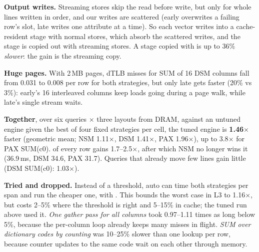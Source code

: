 \textbf{Output writes.} Streaming stores skip the read before write, but only for whole lines
written in order, and our writes are scattered (early overwrites a failing row's slot, late
writes one attribute at a time). So each vector writes into a cache-resident stage with normal
stores, which absorb the scattered writes, and the stage is copied out with streaming stores. A
stage copied with  is up to 36\% \emph{slower}: the gain is the streaming copy.

\textbf{Huge pages.} With 2\,MB pages, dTLB misses for SUM of 16 DSM columns fall from 0.031 to
0.008 per row for both strategies, but only late gets faster (20\% vs 3\%): early's 16
interleaved columns keep loads going during a page walk, while late's single stream waits.

\textbf{Together}, over six queries $\times$ three layouts from DRAM, against an untuned engine
given the best of four fixed strategies per cell, the tuned engine is \textbf{1.46$\times$}
faster (geometric mean; NSM 1.11$\times$, DSM 1.41$\times$, PAX 1.96$\times$), up to 3.8$\times$
for PAX SUM(c0).  of every row gains 1.7--2.5$\times$, after which NSM no longer
wins it (36.9\,ms, DSM 34.6, PAX 31.7). Queries that already move few lines gain little (DSM
SUM(c0): 1.03$\times$).

\textbf{Tried and dropped.} Instead of a threshold, auto can time both strategies per span and
run the cheaper one, with . This bounds the worst case in L3 to
1.16$\times$, but costs 2--5\% where the threshold is right and 5--15\% in cache; the tuned run
above used it. \emph{One gather pass for all columns} took 0.97--1.11 times as long below 5\%,
because the per-column loop already keeps many misses in flight. \emph{SUM over dictionary codes
by counting} was 10--25\% slower than one lookup per row, because counter updates to the same
code wait on each other through memory.
